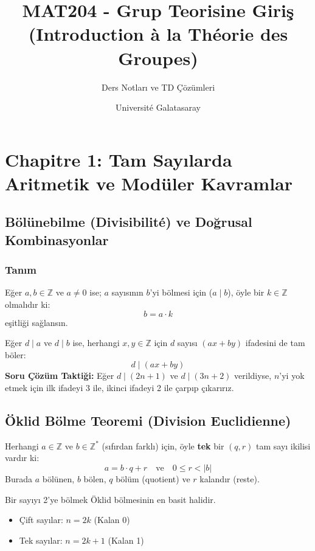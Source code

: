 \documentclass[12pt,a4paper]{report}
\title{\textbf{MAT204 - Grup Teorisine Giriş\\ (Introduction à la Théorie des Groupes)}}
\author{Ders Notları ve TD Çözümleri}
\date{Université Galatasaray}
\begin{document}
\shorthandoff{=}
\maketitle
\tableofcontents

\chapter{Chapitre 1: Tam Sayılarda Aritmetik ve Modüler Kavramlar}

\section{Bölünebilme (Divisibilité) ve Doğrusal Kombinasyonlar}

\subsection*{Tanım}
Eğer $a, b \in \mathbb{Z}$ ve $a \neq 0$ ise; $a$ sayısının $b$'yi bölmesi için ($a \mid b$), öyle bir $k \in \mathbb{Z}$ olmalıdır ki:
\[ b = a \cdot k \]
eşitliği sağlansın.

\begin{tcolorbox}[colback=blue!5!white,colframe=blue!75!black,title=Doğrusal Kombinasyon Özelliği (Çok Önemli!)]
Eğer $d \mid a$ ve $d \mid b$ ise, herhangi $x, y \in \mathbb{Z}$ için $d$ sayısı $(ax + by)$ ifadesini de tam böler:
\[ d \mid (ax + by) \]
\textbf{Soru Çözüm Taktiği:} Eğer $d \mid (2n+1)$ ve $d \mid (3n+2)$ verildiyse, $n$'yi yok etmek için ilk ifadeyi 3 ile, ikinci ifadeyi 2 ile çarpıp çıkarırız.
\end{tcolorbox}

\section{Öklid Bölme Teoremi (Division Euclidienne)}
Herhangi $a \in \mathbb{Z}$ ve $b \in \mathbb{Z}^*$ (sıfırdan farklı) için, öyle \textbf{tek} bir $(q, r)$ tam sayı ikilisi vardır ki:
\[ a = b \cdot q + r \quad \text{ve} \quad 0 \leq r < |b| \]
Burada $a$ bölünen, $b$ bölen, $q$ bölüm (quotient) ve $r$ kalandır (reste).

\begin{tcolorbox}[colback=green!5!white,colframe=green!75!black,title=Parite (Tek/Çift Sayılar)]
Bir sayıyı 2'ye bölmek Öklid bölmesinin en basit halidir.
\begin{itemize}
    \item Çift sayılar: $n = 2k$ (Kalan 0)
    \item Tek sayılar: $n = 2k + 1$ (Kalan 1)
\end{itemize}
\end{tcolorbox}
\end{document}
